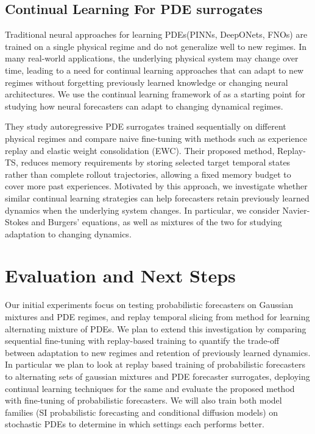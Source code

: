 \documentclass{article}
\begin{document}
\subsection{Continual Learning For PDE surrogates}
Traditional neural approaches for learning PDEs(PINNs, DeepONets, FNOs) are trained on a single physical regime and do not generalize well to new regimes. In many real-world applications, the underlying physical system may change over time, leading to a need for continual learning approaches that can adapt to new regimes without forgetting previously learned knowledge or changing neural architectures. We use the continual learning framework of \cite{hemati2026continual} as a starting point for studying how neural forecasters can adapt to changing dynamical regimes.

They study autoregressive PDE surrogates trained sequentially on different physical regimes and compare naive fine-tuning with methods such as experience replay and elastic weight consolidation (EWC). Their proposed method, Replay-TS, reduces memory requirements by storing selected target temporal states rather than complete rollout trajectories, allowing a fixed memory budget to cover more past experiences. Motivated by this approach, we investigate whether similar continual learning strategies can help forecasters retain previously learned dynamics when the underlying system changes. In particular, we consider Navier-Stokes and Burgers' equations, as well as mixtures of the two for studying adaptation to changing dynamics.

\section{Evaluation and Next Steps}
Our initial experiments focus on testing probabilistic forecasters on Gaussian mixtures and PDE regimes, and replay temporal slicing from \cite{hemati2026continual}  method for learning alternating mixture of PDEs. We plan to extend this investigation by comparing sequential fine-tuning with replay-based training to quantify the trade-off between adaptation to new regimes and retention of previously learned dynamics. In particular we plan to look at replay based training of probabilistic forecasters to alternating sets of gaussian mixtures and PDE forecaster surrogates, deploying continual learning techniques for the same and evaluate the proposed method with fine-tuning of probabilistic
forecasters. We will also train both model families (SI probabilistic forecasting and conditional diffusion models) on stochastic PDEs to determine in which settings each performs better.
\end{document}
